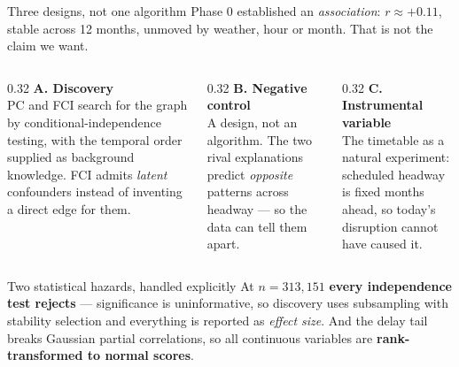 \documentclass[aspectratio=169,10pt]{beamer}
\newcommand{\srcnote}[1]{{\scriptsize\color{ink3}#1}}
\begin{document}
\begin{frame}{Three designs, not one algorithm}
  Phase 0 established an \emph{association}: $r\approx+0.11$, stable across 12 months,
  unmoved by weather, hour or month. That is not the claim we want.

  \vspace{0.7em}
  \begin{columns}[T]
    \begin{column}{0.32\textwidth}
      \textbf{A. Discovery}\\[0.3em]
      \srcnote{PC and FCI search for the graph by conditional-independence testing, with the
      temporal order supplied as background knowledge. FCI admits \emph{latent} confounders
      instead of inventing a direct edge for them.}
    \end{column}
    \begin{column}{0.32\textwidth}
      \textbf{B. Negative control}\\[0.3em]
      \srcnote{A design, not an algorithm. The two rival explanations predict
      \emph{opposite} patterns across headway --- so the data can tell them apart.}
    \end{column}
    \begin{column}{0.32\textwidth}
      \textbf{C. Instrumental variable}\\[0.3em]
      \srcnote{The timetable as a natural experiment: scheduled headway is fixed months
      ahead, so today's disruption cannot have caused it.}
    \end{column}
  \end{columns}

  \vspace{0.9em}
  \begin{block}{\small Two statistical hazards, handled explicitly}
    \small
    At $n=313{,}151$ \textbf{every independence test rejects} --- significance is
    uninformative, so discovery uses subsampling with stability selection and everything is
    reported as \emph{effect size}. And the delay tail breaks Gaussian partial correlations,
    so all continuous variables are \textbf{rank-transformed to normal scores}.
  \end{block}
\end{frame}
\end{document}
